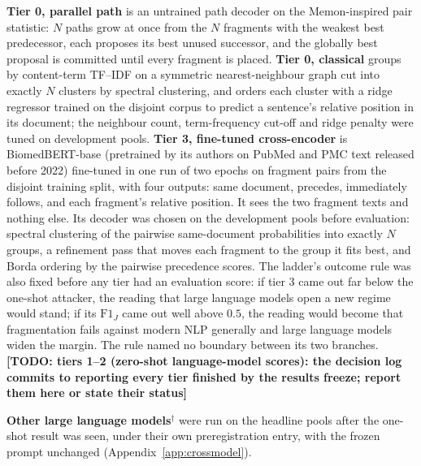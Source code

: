 \documentclass[sigconf,review]{acmart}
\newcommand{\FJ}{\ensuremath{\mathrm{F1}_{J}}}
\newcommand{\posthoc}{\ensuremath{^{\dagger}}}
\newcommand{\TODO}[1]{\textbf{[TODO: #1]}}
\begin{document}
\textbf{Tier 0, parallel path} is an untrained path decoder on the
Memon-inspired pair statistic: $N$ paths grow at once from the $N$ fragments
with the weakest best predecessor, each proposes its best unused successor, and
the globally best proposal is committed until every fragment is placed.
\textbf{Tier 0, classical} groups by content-term TF--IDF on a symmetric
nearest-neighbour graph cut into exactly $N$ clusters by spectral clustering,
and orders each cluster with a ridge regressor trained on the disjoint corpus
to predict a sentence's relative position in its document; the neighbour
count, term-frequency cut-off and ridge penalty were tuned on development
pools. \textbf{Tier 3, fine-tuned cross-encoder} is
\textsf{BiomedBERT-base} (pretrained by its authors on PubMed and PMC text
released before 2022) fine-tuned in one run of two epochs on fragment pairs
from the disjoint training split, with four outputs: same document, precedes,
immediately follows, and each fragment's relative position. It sees the two
fragment texts and nothing else. Its decoder was chosen on the development
pools before evaluation: spectral clustering of the pairwise same-document
probabilities into exactly $N$ groups, a refinement pass that moves each
fragment to the group it fits best, and Borda ordering by the pairwise
precedence scores. The ladder's outcome rule was also fixed before any tier
had an evaluation score: if tier 3 came out far below the one-shot attacker,
the reading that large language models open a new regime would stand; if its
\FJ{} came out well above $0.5$, the reading would become that fragmentation
fails against modern NLP generally and large language models widen the margin.
The rule named no boundary between its two branches.
\TODO{tiers 1--2 (zero-shot language-model scores): the decision log commits
to reporting every tier finished by the results freeze; report them here or
state their status}

\textbf{Other large language models}\posthoc{} were run on the headline pools
after the one-shot result was seen, under their own preregistration entry, with
the frozen prompt unchanged (Appendix~\ref{app:crossmodel}).
\end{document}
